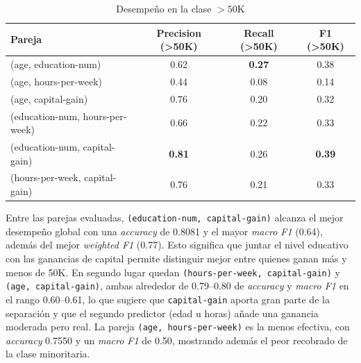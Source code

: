 \documentclass[12pt,a4paper]{article}
\begin{document}
\begin{enumerate}
\begin{itemize}
      \begin{table}[H]
        \centering
        \small
        \begin{tabular}{lccc}
          \toprule
          \textbf{Pareja} & \textbf{Precision (>50K)} & \textbf{Recall (>50K)} & \textbf{F1 (>50K)} \\
          \midrule
          (age, education-num)            & 0.62 & \textbf{0.27} & 0.38 \\
          (age, hours-per-week)           & 0.44 & 0.08          & 0.14 \\
          (age, capital-gain)             & 0.76 & 0.20          & 0.32 \\
          (education-num, hours-per-week) & 0.66 & 0.22          & 0.33 \\
          (education-num, capital-gain)   & \textbf{0.81} & 0.26 & \textbf{0.39} \\
          (hours-per-week, capital-gain)  & 0.76 & 0.21          & 0.33 \\
          \bottomrule
        \end{tabular}
        \caption{Desempeño en la clase $>50$K}
        \label{tab:minoritaria_parejas}
      \end{table}

      Entre las parejas evaluadas, \texttt{(education-num, capital-gain)} alcanza el mejor desempeño global con una \emph{accuracy} de 0.8081 
      y el mayor \emph{macro F1} (0.64), además del mejor \emph{weighted F1} (0.77). Esto significa que juntar el nivel educativo con las ganancias de capital 
      permite distinguir mejor entre quienes ganan más y menos de 50K. En segundo lugar quedan \texttt{(hours-per-week, capital-gain)} y 
      \texttt{(age, capital-gain)}, ambas alrededor de 0.79–0.80 de \emph{accuracy} y \emph{macro F1} en el rango 0.60–0.61, lo que sugiere que 
      \texttt{capital-gain} aporta gran parte de la separación y que el segundo predictor (edad u horas) añade una ganancia moderada pero real. 
      La pareja \texttt{(age, hours-per-week)} es la menos efectiva, con \emph{accuracy} 0.7550 y un \emph{macro F1} de 0.50, mostrando además el 
      peor recobrado de la clase minoritaria.


\end{itemize}
\end{enumerate}
\end{document}
